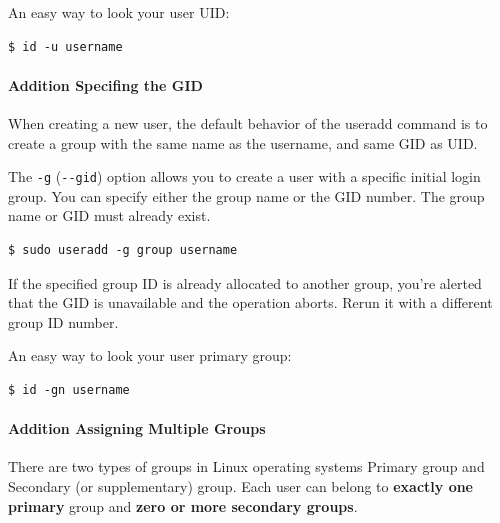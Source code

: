 \documentclass{article}
\newenvironment{blocktemplateI}[1]{%
    \tcolorbox[beamer,%
    noparskip,breakable,
    colframe=Violet,%
    colbacklower=Black,%
    title=#1]}%
    {\endtcolorbox}
\newenvironment{blocktemplateIII}[1]{%
    \tcolorbox[beamer,%
    noparskip,breakable,
    ,colframe=Red,%
    colbacklower=LimeGreen!75!LightGreen,%
    title=#1]}%
    {\endtcolorbox}
\newenvironment{codetemplate}[1][]{%
  \mybasecolorbox[#1]
  \itshape
}{%
  \endmybasecolorbox
}
\begin{document}
\begin{blocktemplateI}{NOTE}
An easy way to look your user UID:
\begin{codetemplate}{}
\begin{verbatim}
$ id -u username
\end{verbatim}
\end{codetemplate}
\end{blocktemplateI}

\paragraph{Addition Specifing the GID}
When creating a new user, the default behavior of the useradd command is to create a group with the same name as the username, and same GID as UID.

The \verb|-g| (\verb|--gid|) option allows you to create a user with a specific initial login group. You can specify either the group name or the GID number. The group name or GID must already exist.
\begin{codetemplate}{}
\begin{verbatim}
$ sudo useradd -g group username
\end{verbatim}
\end{codetemplate}

\begin{blocktemplateIII}{WARNING}
If the specified group ID is already allocated to another group, you're alerted that the GID is unavailable and the operation aborts. Rerun it with a different group ID number.
\end{blocktemplateIII}

\begin{blocktemplateI}{NOTE}
An easy way to look your user primary group:
\begin{codetemplate}{}
\begin{verbatim}
$ id -gn username
\end{verbatim}
\end{codetemplate}
\end{blocktemplateI}

\paragraph{Addition Assigning Multiple Groups}

There are two types of groups in Linux operating systems Primary group and Secondary (or supplementary) group. Each user can belong to \textbf{exactly one primary} group and\textbf{ zero or more secondary groups}.
\end{document}
